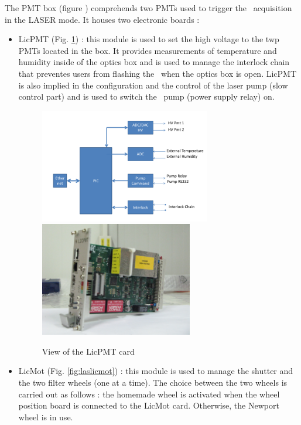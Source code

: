 The PMT box (figure ) comprehends two PMTs used to trigger the \laserii~acquisition in the LASER mode. It houses two electronic boards :
\begin{itemize}

\item LicPMT (Fig. \ref{fig:laslicpmt}) : this module is used to set the high voltage to the twp PMTs located in the box. It provides measurements of temperature and humidity inside of the optics box and is used to manage the interlock chain that preventes users from flashing the \laser~when the optics box is open. LicPMT is also implied in the configuration and the control of the laser pump (slow control part) and is used to switch the \laser~pump (power supply relay) on. 



\begin{figure}[htbp]
\centering
\includegraphics[height=5cm]{figures/licpmt_scheme.pdf}
\includegraphics[height=5cm]{figures/licpmt.JPG}
\caption{View of the LicPMT card}\label{fig:laslicpmt}
\end{figure}

\item LicMot (Fig. \ref{fig:laslicmot}) : this module is used to manage the shutter and the two filter wheels (one at a time). The choice between the two wheels is carried out as follows : the homemade wheel is activated when the wheel position board is connected to the LicMot card. Otherwise, the Newport wheel is in use.


\end{itemize}
